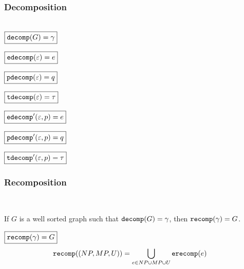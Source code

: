 \figureDecompositionDefHelpersContent


\subsubsection{Decomposition}\hspace*{\fill} \\

\noindent $\boxed{\decomp{G} = \Grove}$
%
\figureDecompositionDefDecomp

\noindent $\boxed{\edecomp{\e} = e}$
%
\figureDecompositionDefEdecomp

\noindent $\boxed{\pdecomp{\e} = q}$
%
\figureDecompositionDefPdecomp

\noindent $\boxed{\tdecomp{\e} = \tau}$
%
\figureDecompositionDefTdecomp

\noindent $\boxed{\edecompPrime{\e}{p} = e}$
%
\figureDecompositionDefEdecompPrime

\noindent $\boxed{\pdecompPrime{\e}{p} = q}$
%
\figureDecompositionDefPdecompPrime

\noindent $\boxed{\tdecompPrime{\e}{p} = \tau}$
%
\figureDecompositionDefTdecompPrime%


\subsubsection{Recomposition}\hspace*{\fill} \\

\begin{theorem}
  If $G$ is a well sorted graph such that $\decomp{G} = \Grove$,
  then $\recomp{\Grove} = G$.
\end{theorem}

\noindent $\boxed{\recomp{\Grove} = G}$
%
\begin{align*}
  \recomp{(NP, MP, U)} &= \bigcup_{e \in NP \cup MP \cup U} \erecomp{e}
\end{align*}

